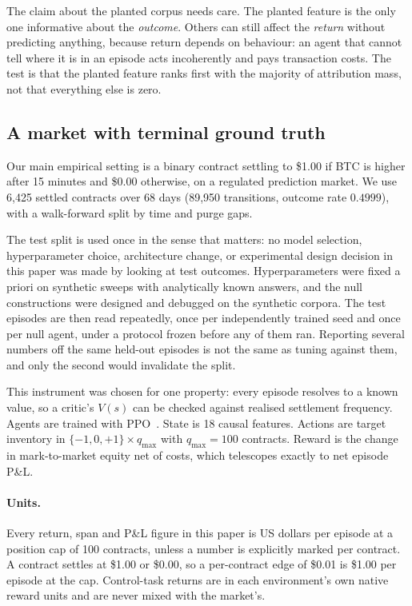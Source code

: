 \documentclass[10pt,twocolumn]{article}
\begin{document}
The claim about the planted corpus needs care. The planted feature is the only
one informative about the \emph{outcome}. Others can still affect the
\emph{return} without predicting anything, because return depends on behaviour:
an agent that cannot tell where it is in an episode acts incoherently and pays
transaction costs. The test is that the planted feature ranks first with the
majority of attribution mass, not that everything else is zero.

\subsection{A market with terminal ground truth}
\label{sec:market}

Our main empirical setting is a binary contract settling to \$1.00 if BTC is
higher after 15 minutes and \$0.00 otherwise, on a regulated prediction market.
We use 6{,}425 settled contracts over 68 days (89{,}950 transitions, outcome rate
$0.4999$), with a walk-forward split by time and purge gaps.

The test split is used once in the sense that matters: no model selection,
hyperparameter choice, architecture change, or experimental design decision in
this paper was made by looking at test outcomes. Hyperparameters were fixed a
priori on synthetic sweeps with analytically known answers, and the null
constructions were designed and debugged on the synthetic corpora. The test
episodes are then read repeatedly, once per independently trained seed and once
per null agent, under a protocol frozen before any of them ran. Reporting
several numbers off the same held-out episodes is not the same as tuning
against them, and only the second would invalidate the split.

This instrument was chosen for one property: every episode resolves to a known
value, so a critic's $V(s)$ can be checked against realised settlement frequency.
Agents are trained with PPO~\citep{schulman2017ppo}. State is 18 causal
features. Actions are target inventory in
$\{-1,0,+1\}\times q_{\max}$ with $q_{\max}=100$ contracts. Reward is the change
in mark-to-market equity net of costs, which telescopes exactly to net episode
P\&L.

\paragraph{Units.} Every return, span and P\&L figure in this paper is US
dollars per episode at a position cap of 100 contracts, unless a number is
explicitly marked per contract. A contract settles at \$1.00 or \$0.00, so a
per-contract edge of \$0.01 is \$1.00 per episode at the cap. Control-task
returns are in each environment's own native reward units and are never mixed
with the market's.
\end{document}
